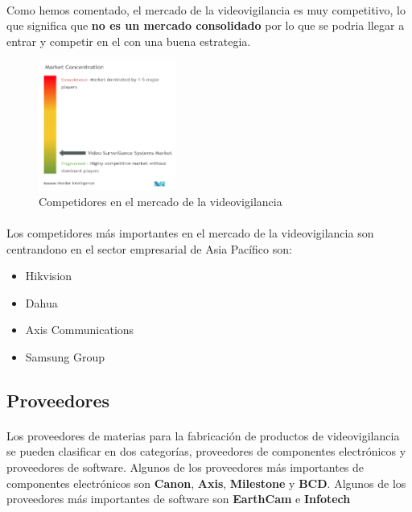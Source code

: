 \documentclass{report}
\begin{document}
          \paragraph*{}{Como hemos comentado, el mercado de la videovigilancia es muy competitivo, lo que significa que \textbf{no es un mercado consolidado} por lo que se podria llegar a entrar y competir en el con una buena estrategia.}
          \begin{figure}[H]
            \centering
            \includegraphics[width=0.4\textwidth]{./img/competidores.png}
            \caption{Competidores en el mercado de la videovigilancia}
          \end{figure}
          \paragraph*{}{Los competidores más importantes en el mercado de la videovigilancia son centrandono en el sector empresarial de Asia Pacífico son:}
          \begin{multicols}{2}
            \begin{itemize}
              \item Hikvision
              \item Dahua
              \item Axis Communications
              \item Samsung Group
            \end{itemize}
          \end{multicols}
        \subsection*{Proveedores}
          \paragraph*{}
          {
            Los proveedores de materias para la fabricación de productos de videovigilancia se pueden clasificar en dos categorías, proveedores de componentes electrónicos y proveedores de software. 
            Algunos de los proveedores más importantes de componentes electrónicos son \textbf{Canon}, \textbf{Axis}, \textbf{Milestone} y \textbf{BCD}. 
            Algunos de los proveedores más importantes de software son \textbf{EarthCam} e \textbf{Infotech}
          }
\end{document}
